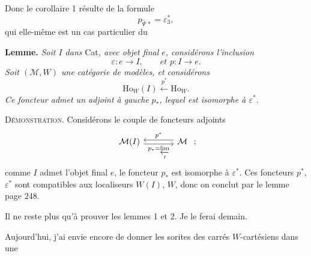 \documentclass[11pt]{article}
\newcommand{\printedpage}[1]{\marginpar{\footnotesize p.~#1}}
\newcommand{\msp}[1]{\marginpar{\footnotesize [#1]}}
\newcommand{\Ho}{\mathrm{Ho}}
\begin{document}
\msp{page 257}
Donc le corollaire 1 résulte de la formule
\[
p_{\tilde{\Psi}\,*}=\varepsilon_3^*,
\]
qui elle-même est un cas particulier du

\printedpage{167}

\textbf{Lemme.} \textit{Soit $I$ dans} Cat\textit{, avec objet final $e$, considérons l'inclusion}
\[
\varepsilon : e\longrightarrow I,\qquad \textit{et } p : I\longrightarrow e.
\]
\textit{Soit $(\mathcal{M},W)$ une catégorie de modèles, et considérons}
\[
\Ho_W(I)\xleftarrow{\ p^*\ }\Ho_W.
\]
\textit{Ce foncteur admet un adjoint à gauche} \textit{$p_*$, lequel est isomorphe à $\varepsilon^*$.}

\textsc{Démonstration}. Considérons le couple de foncteurs adjoints
\[
\begin{tikzcd}[ampersand replacement=\&, column sep=large]
\mathcal{M}(I) \arrow[r, shift right, "p_*=\varprojlim\limits_I"'] \& \mathcal{M} \arrow[l, shift right, "p^*"']
\end{tikzcd}\ ;
\]
comme $I$ admet l'objet final $e$, le foncteur $p_*$ est isomorphe à $\varepsilon^*$. Ces foncteurs $p^*$, $\varepsilon^*$ sont compatibles aux localiseurs $W(I)$, $W$, donc on conclut par le lemme page 248.

Il ne reste plus qu'à prouver les lemmes 1 et 2. Je le ferai demain.

\msp{page 258}
Aujourd'hui, j'ai envie encore de donner les sorites des carrés $W$-cartésiens dans une
\end{document}
